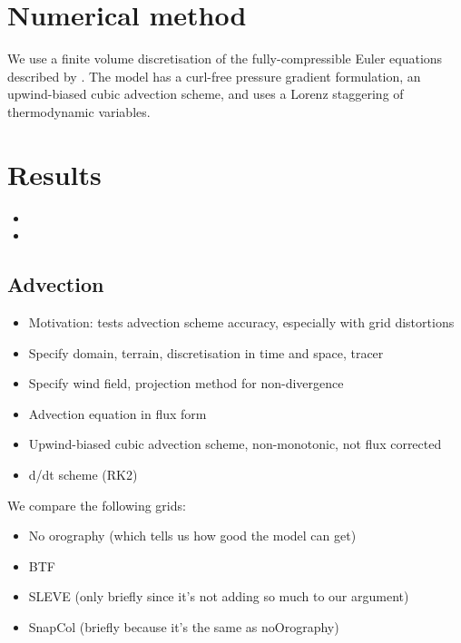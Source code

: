 \documentclass[twocol]{ametsoc}
\begin{document}

\section{Numerical method}
We use a finite volume discretisation of the fully-compressible Euler equations described by \citet{weller-shahrokhi2014}.  The model has a curl-free pressure gradient formulation, an upwind-biased cubic advection scheme, and uses a Lorenz staggering of thermodynamic variables.

\section{Results}
\begin{itemize}
	\item {}
	\item {}
\end{itemize}

\subsection{Advection}
\begin{itemize}
	\item Motivation: tests advection scheme accuracy, especially with grid distortions
	\item Specify domain, terrain, discretisation in time and space, tracer
	\item Specify wind field, projection method for non-divergence
	\item Advection equation in flux form
	\item Upwind-biased cubic advection scheme, non-monotonic, not flux corrected
	\item d/dt scheme (RK2)
\end{itemize}

We compare the following grids:
\begin{itemize}
	\item No orography (which tells us how good the model can get)
	\item BTF
	\item SLEVE (only briefly since it's not adding so much to our argument)
	\item SnapCol (briefly because it's the same as noOrography)
\end{itemize}
\end{document}
